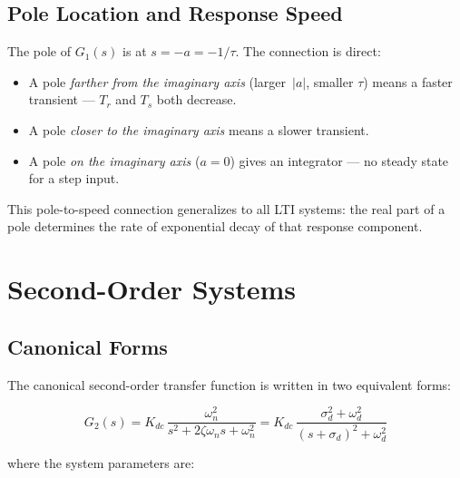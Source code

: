 \documentclass[12pt]{article}
\begin{document}
\subsection{Pole Location and Response Speed}
\label{sec:first_pole}

The pole of $G_1(s)$ is at $s = -a = -1/\tau$.  The connection is direct:
\begin{itemize}
  \item A pole \emph{farther from the imaginary axis} (larger~$|a|$, smaller
    $\tau$) means a faster transient --- $T_r$ and $T_s$ both decrease.
  \item A pole \emph{closer to the imaginary axis} means a slower transient.
  \item A pole \emph{on the imaginary axis} ($a = 0$) gives an integrator ---
    no steady state for a step input.
\end{itemize}

This pole-to-speed connection generalizes to all LTI systems: the real part
of a pole determines the rate of exponential decay of that response component.

\section{Second-Order Systems}
\label{sec:second}

\subsection{Canonical Forms}
\label{sec:second_forms}

The canonical second-order transfer function is written in two equivalent forms:

\begin{equation}
  G_2(s)
    = K_{dc}\,\frac{\omega_n^2}{s^2 + 2\zeta\omega_n s + \omega_n^2}
    = K_{dc}\,\frac{\sigma_d^2 + \omega_d^2}{(s+\sigma_d)^2 + \omega_d^2}
  \label{eq:G2}
\end{equation}

where the system parameters are:
\end{document}
